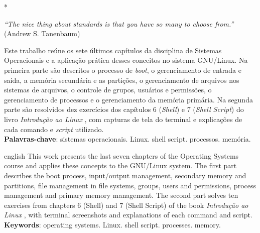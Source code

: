 \documentclass[12pt, a4paper, oneside, openany, chapter=TITLE, subsection=TITLE, section=TITLE, subsubsection=TITLE, subsubsubsection=TITLE, english, german, brazil]{abntex2}
\begin{document}
\pretextual
\imprimircapa
\imprimirfolhaderosto[]*
\makeatother\clearpage

\begin{epigrafe}
    \vspace*{\fill}
    \begin{flushright}
        \textit{``The nice thing about standards is that you have so many to choose from.''}\\
        (Andrew S. Tanenbaum)
    \end{flushright}
\end{epigrafe}
\clearpage

\begin{resumo}[Resumo]
    Este trabalho reúne os sete últimos capítulos da disciplina de Sistemas Operacionais e a
    aplicação prática desses conceitos no sistema GNU/Linux. Na primeira parte são descritos o
    processo de \textit{boot}, o gerenciamento de entrada e saída, a memória secundária e as
    partições, o gerenciamento de arquivos nos sistemas de arquivos, o controle de grupos,
    usuários e permissões, o gerenciamento de processos e o gerenciamento da memória
    primária. Na segunda parte são resolvidos dez exercícios dos capítulos 6 (\textit{Shell}) e 7
    (\textit{Shell Script}) do livro \textit{Introdução ao Linux} \cite{peixoto2013}, com capturas de
    tela do terminal e explicações de cada comando e \textit{script} utilizado. \\
    \vspace{\onelineskip}
    \noindent
    \textbf{Palavras-chave}: sistemas operacionais. Linux. shell script. processos. memória.
\end{resumo}

\begin{resumo}[Abstract]
    \begin{otherlanguage*}{english}
    This work presents the last seven chapters of the Operating Systems course and applies
    these concepts to the GNU/Linux system. The first part describes the boot process,
    input/output management, secondary memory and partitions, file management in file
    systems, groups, users and permissions, process management and primary memory
    management. The second part solves ten exercises from chapters 6 (Shell) and 7 (Shell
    Script) of the book \textit{Introdução ao Linux} \cite{peixoto2013}, with terminal screenshots
    and explanations of each command and script. \\
    \vspace{\onelineskip}
    \noindent
    \textbf{Keywords}: operating systems. Linux. shell script. processes. memory.
    \end{otherlanguage*}
\end{resumo}
\end{document}
